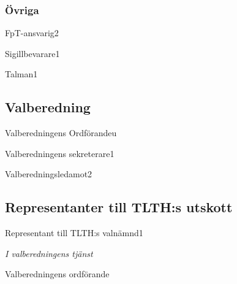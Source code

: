 \documentclass[10pt]{article}
\begin{document}
\subsubsection{Övriga}
\begin{vallista}
    \begin{post}{FpT-ansvarig}{2}
    \end{post}
    \begin{post}{Sigillbevarare}{1}
    \end{post}
    \begin{post}{Talman}{1}
    \end{post}
\end{vallista}

\subsection{Valberedning}
\begin{vallista}
    \begin{post}{Valberedningens Ordförande}{u}
        \vakant
    \end{post}
    \begin{post}{Valberedningens sekreterare}{1}
        \vakant
    \end{post}
    \begin{post}{Valberedningsledamot}{2}
        \vakant
    \end{post}
\end{vallista}

\subsection{Representanter till TLTH:s utskott}
\begin{vallista}
    \begin{post}{Representant till TLTH:s valnämnd}{1}
        \vakant
    \end{post}
\end{vallista}

\begin{signatures}{1}
\emph{I valberedningens tjänst}
\signature{Elin Magnusson}{Valberedningens ordförande}
\end{signatures}
\end{document}
